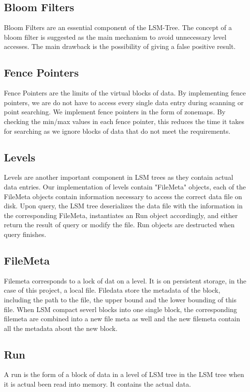\documentclass[sigconf]{acmart}
\begin{document}
    \subsection{Bloom Filters}
    Bloom Filters are an essential component of the LSM-Tree. The concept of a bloom filter is suggested as the main mechanism to avoid unnecessary level accesses. The main drawback is the possibility of giving a false positive result.

    \subsection{Fence Pointers}
    Fence Pointers are the limits of the virtual blocks of data. By implementing fence pointers, we are do not have to access every single data entry during scanning or point searching. We implement fence pointers in the form of zonemaps. By checking the min/max values in each fence pointer, this reduces the time it takes for searching as we ignore blocks of data that do not meet the requirements.

    \subsection{Levels}
    Levels are another important component in LSM trees as they contain actual data entries. Our implementation of levels contain "FileMeta" objects, each of the FileMeta objects contain information necessary to access the correct data file on disk. Upon query, the LSM tree deserializes the data file with the information in the corresponding FileMeta, instantiates an Run object accordingly, and either return the result of query or modify the file. Run objects are destructed when query finishes.

    \subsection{FileMeta}
    Filemeta corresponds to a lock of dat on a level. It is on persistent storage, in the case of this project, a local file. Filedata store the metadata of the block, including the path to the file, the upper bound and the lower bounding of this file. When LSM compact severl blocks into one single block, the corresponding filemeta are combined into a new file meta as well and the new filemeta contain all the metadata about the new block.

    \subsection{Run}
    A run is the form of a block of data in a level of LSM tree in the LSM tree when it is actual been read into memory. It contains the actual data.
\end{document}
